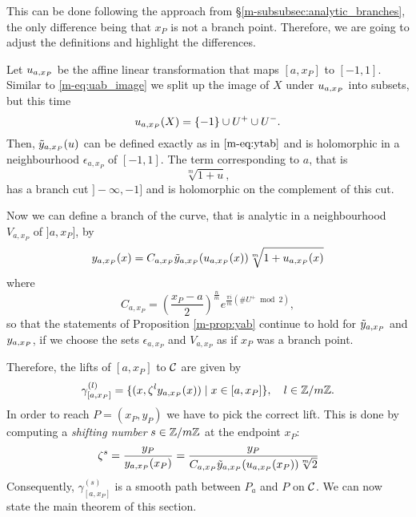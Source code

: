 \documentclass[main.tex]{subfiles}
\begin{document}
  This can be done following  the approach from \S \ref{m-subsubsec:analytic_branches}, the only difference being that
  $x_P$ is not a branch point. Therefore, we are going to adjust the definitions and highlight the differences.

  Let  $u_{a,x_P}$ be the affine linear transformation
  that maps $[a,x_P]$ to $[-1,1]$.
  Similar to \eqref{m-eq:uab_image} we split up the image of $X$ under $u_{a,x_P}$ into subsets,
  but this time
 \begin{equation*}
  u_{a,x_P}(X) = \{-1\} \cup U^+ \cup U^-.
 \end{equation*}
  Then, $\tilde{y}_{a,x_P}(u)$ can be defined exactly as in $\eqref{m-eq:ytab}$ and
  is holomorphic in a neighbourhood $\epsilon_{a,x_P}$ of $[-1,1]$.
  The term corresponding to $a$, that is
  \begin{equation*}
   \sqrt[m]{1+u},
  \end{equation*}
   has a branch cut $]-\infty,-1]$ and is holomorphic on the complement of this cut.

  Now we can define a branch of the curve,
   that is analytic in a neighbourhood $V_{a,x_P}$ of $]a,x_P]$, by
  \begin{equation*}
    y_{a,x_P}(x) =   C_{a,x_P} \tilde{y}_{a,x_P}( u_{a,x_P}(x) ) \sqrt[m]{1 + u_{a,x_P}(x)}
  \end{equation*}
  where
   \begin{equation*}
      C_{a,x_P} = \left(\frac{x_P-a}{2}\right)^{\frac{n}{m}} e^{\frac{\pi i}{m}(\#U^+ \bmod 2)},
  \end{equation*}
  so that the statements of Proposition \ref{m-prop:yab} continue to hold for $\tilde{y}_{a,x_P}$ and $y_{a,x_P}$,
  if we choose the sets $\epsilon_{a,x_P}$ and $V_{a,x_P}$ as if $x_P$ was a branch point.

  Therefore, the lifts of $[a,x_P]$ to $\mathcal{C}$ are given by
    \begin{equation*}\label{eq:def_path_axp}
      \gamma^{(l)}_{[a,x_P]} = \{  (x,\zeta^l y_{a,x_P}(x))  \mid  x \in [a,x_P]  \}, \quad l \in \mathbb{Z}/m\mathbb{Z}.
   \end{equation*}
  In order to reach $P = (x_P,y_P)$ we have to pick the correct lift. This is done by computing a \emph{shifting number} $s \in \mathbb{Z}/m\mathbb{Z}$ at the endpoint $x_P$:
  \begin{equation*}
      \label{eq:saj}
   \zeta^s = \frac{y_P}{y_{a,x_P}(x_P)} = \frac{y_P}{ C_{a,x_P} \tilde{y}_{a,x_P}( u_{a,x_P}(x_P) ) \sqrt[m]{2}  }
  \end{equation*}
  Consequently, $\gamma^{(s)}_{[a,x_P]}$ is a smooth path between $P_a$ and $P$ on $\mathcal{C}$. We can now state the main theorem of this section.
\end{document}
